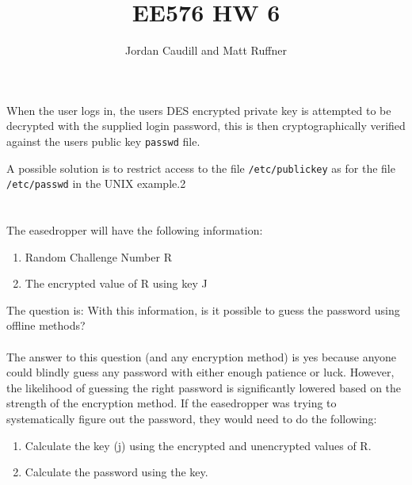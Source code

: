 \documentclass[letterpaper]{article}
\title{EE576 HW 6}
\author{Jordan Caudill and Matt Ruffner}
\begin{document}
\maketitle


\section{}
When the user logs in, the users DES encrypted private key is attempted to be decrypted with the supplied login password, this is then cryptographically verified against the users public key \texttt{passwd} file.

A possible solution is to restrict access to the file \texttt{/etc/publickey} as for the file \texttt{/etc/passwd} in the UNIX example.2

\section{}

The easedropper will have the following information:
\\
\begin{enumerate}
    \item Random Challenge Number R
    \item The encrypted value of R using key J
\end{enumerate}


The question is: With this information, is it possible to guess the password using offline methods?
\\
\\
The answer to this question (and any encryption method) is yes because anyone could blindly guess any password with either enough patience or luck. However, the likelihood of guessing the right password is significantly lowered based on the strength of the encryption method. If the easedropper was trying to systematically figure out the password, they would need to do the following:
\begin{enumerate}
    \item Calculate the key (j) using the encrypted and unencrypted values of R.
    \item Calculate the password using the key.
\end{enumerate}
\end{document}
